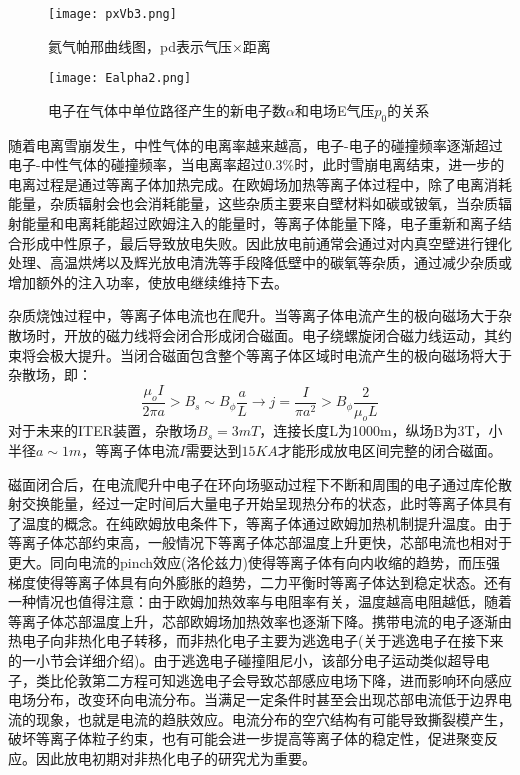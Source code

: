 \begin{figure}[ht]
  \centering
  \texttt{[image: pxVb3.png]}
  \caption{\label{fig:pxcurve} 氦气帕邢曲线图，pd表示气压×距离 }
\end{figure}


\begin{figure}[ht]
  \centering
  \texttt{[image: Ealpha2.png]}
  \caption{\label{fig:pxcurve2} 电子在气体中单位路径产生的新电子数$\alpha$和电场E气压$p_0$的关系 }
\end{figure}

随着电离雪崩发生，中性气体的电离率越来越高，电子-电子的碰撞频率逐渐超过电子-中性气体的碰撞频率，当电离率超过$0.3\%$时，此时雪崩电离结束，进一步的电离过程是通过等离子体加热完成\cite{RN3}。在欧姆场加热等离子体过程中，除了电离消耗能量，杂质辐射会也会消耗能量，这些杂质主要来自壁材料如碳或铍氧，当杂质辐射能量和电离耗能超过欧姆注入的能量时，等离子体能量下降，电子重新和离子结合形成中性原子，最后导致放电失败。因此放电前通常会通过对内真空壁进行锂化处理、高温烘烤以及辉光放电清洗等手段降低壁中的碳氧等杂质，通过减少杂质或增加额外的注入功率，使放电继续维持下去。

杂质烧蚀过程中，等离子体电流也在爬升。当等离子体电流产生的极向磁场大于杂散场时，开放的磁力线将会闭合形成闭合磁面。电子绕螺旋闭合磁力线运动，其约束将会极大提升。当闭合磁面包含整个等离子体区域时电流产生的极向磁场将大于杂散场，即：
\begin{equation}
\frac{\mu_{o} I}{2 \pi a}>B_{s} \sim B_{\phi} \frac{a}{L} \rightarrow j=\frac{I}{\pi a^{2}}>B_{\phi} \frac{2}{\mu_{o} L}
\end{equation}
对于未来的ITER装置，杂散场$B_s=3mT$，连接长度L为1000m，纵场B为3T，小半径$a\sim1m$，等离子体电流$I$需要达到$15KA$才能形成放电区间完整的闭合磁面。\par
     磁面闭合后，在电流爬升中电子在环向场驱动过程下不断和周围的电子通过库伦散射交换能量，经过一定时间后大量电子开始呈现热分布的状态，此时等离子体具有了温度的概念。在纯欧姆放电条件下，等离子体通过欧姆加热机制提升温度。由于等离子体芯部约束高，一般情况下等离子体芯部温度上升更快，芯部电流也相对于更大。同向电流的pinch效应(洛伦兹力)使得等离子体有向内收缩的趋势，而压强梯度使得等离子体具有向外膨胀的趋势，二力平衡时等离子体达到稳定状态。还有一种情况也值得注意：由于欧姆加热效率与电阻率有关，温度越高电阻越低，随着等离子体芯部温度上升，芯部欧姆场加热效率也逐渐下降。携带电流的电子逐渐由热电子向非热化电子转移，而非热化电子主要为逃逸电子(关于逃逸电子在接下来的一小节会详细介绍)。由于逃逸电子碰撞阻尼小，该部分电子运动类似超导电子，类比伦敦第二方程可知逃逸电子会导致芯部感应电场下降，进而影响环向感应电场分布，改变环向电流分布。当满足一定条件时甚至会出现芯部电流低于边界电流的现象，也就是电流的趋肤效应。电流分布的空穴结构有可能导致撕裂模产生，破坏等离子体粒子约束\cite{duchs1972skin}，也有可能会进一步提高等离子体的稳定性，促进聚变反应\cite{gourdain2009hollow}。因此放电初期对非热化电子的研究尤为重要。




